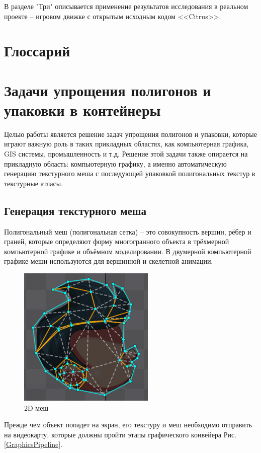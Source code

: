 \documentclass{fefu_thesis/cls/fefu}
\begin{document}
    В разделе "Три" описывается применение результатов исследования в реальном проекте -- игровом движке с открытым исходным кодом <<Citrus>>.

    \section*{Глоссарий}
    \section{Задачи упрощения полигонов и упаковки в контейнеры}

    Целью работы является решение задач упрощения полигонов и упаковки, которые играют важную роль в таких прикладных областях, как компьютерная графика, GIS системы, промышленность и т.д. Решение этой задачи также опирается на прикладную область: компьютерную графику, а именно автоматическую генерацию текстурного меша с последующей упаковкой полигональных текстур в текстурные атласы.

    \subsection{Генерация текстурного меша}
    \label{TextureMeshGeneration}
    Полигональный меш (полигональная сетка) -- это совокупность вершин, рёбер и граней, которые определяют форму многогранного объекта в трёхмерной компьютерной графике и объёмном моделировании. В двумерной компьютерной графике меши используются для вершинной и скелетной анимации.

    \begin{figure}[H]
        \centering
        \includegraphics[scale=0.5]{images/spine_mesh.png}
        \caption{2D меш}
    \end{figure}

    Прежде чем объект попадет на экран, его текстуру и меш необходимо отправить на видеокарту, которые должны пройти этапы графического конвейера Рис. \ref{GraphicsPipeline}.
\end{document}
